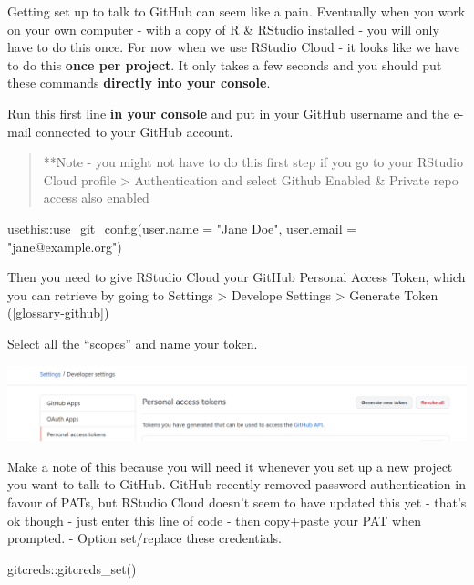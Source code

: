\documentclass[
]{book}
\newenvironment{Shaded}{\begin{snugshade}}{\end{snugshade}}
\newcommand{\AttributeTok}[1]{\textcolor[rgb]{0.77,0.63,0.00}{#1}}
\newcommand{\FunctionTok}[1]{\textcolor[rgb]{0.00,0.00,0.00}{#1}}
\newcommand{\NormalTok}[1]{#1}
\newcommand{\SpecialCharTok}[1]{\textcolor[rgb]{0.00,0.00,0.00}{#1}}
\newcommand{\StringTok}[1]{\textcolor[rgb]{0.31,0.60,0.02}{#1}}
\begin{document}
Getting set up to talk to GitHub can seem like a pain. Eventually when you work on your own computer - with a copy of R \& RStudio installed - you will only have to do this once. For now when we use RStudio Cloud - it looks like we have to do this \textbf{once per project}. It only takes a few seconds and you should put these commands \textbf{directly into your console}.

Run this first line \textbf{in your console} and put in your GitHub username and the e-mail connected to your GitHub account.

\begin{quote}
**Note - you might not have to do this first step if you go to your RStudio Cloud profile \textgreater{} Authentication and select Github Enabled \& Private repo access also enabled
\end{quote}

\begin{Shaded}
\begin{Highlighting}[]
\NormalTok{usethis}\SpecialCharTok{::}\FunctionTok{use\_git\_config}\NormalTok{(}\AttributeTok{user.name =} \StringTok{"Jane Doe"}\NormalTok{, }\AttributeTok{user.email =} \StringTok{"jane@example.org"}\NormalTok{)}
\end{Highlighting}
\end{Shaded}

Then you need to give RStudio Cloud your GitHub Personal Access Token, which you can retrieve by going to Settings \textgreater{} Develope Settings \textgreater{} Generate Token (\ref{glossary-github})

Select all the ``scopes'' and name your token.

\includegraphics[width=25.19in]{images/git-PAT}

Make a note of this because you will need it whenever you set up a new project you want to talk to GitHub. GitHub recently removed password authentication in favour of PATs, but RStudio Cloud doesn't seem to have updated this yet - that's ok though - just enter this line of code - then copy+paste your PAT when prompted. - Option set/replace these credentials.

\begin{Shaded}
\begin{Highlighting}[]
\NormalTok{gitcreds}\SpecialCharTok{::}\FunctionTok{gitcreds\_set}\NormalTok{()}
\end{Highlighting}
\end{Shaded}
\end{document}
